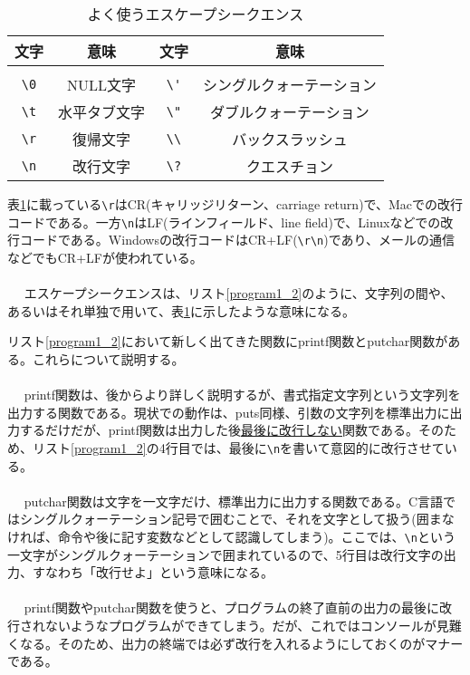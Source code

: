 \begin{table}[htbp]
 \centering
 \caption{よく使うエスケープシークエンス}\label{escape_seq}
  \begin{tabular}{|c|c||c|c|} \hline
            文字&意味&文字&意味        \\ \hline
              &&&          \\[-15.5pt] \hline
   \verb|\0| & NULL文字 &\verb|\'| & シングルクォーテーション\\ \hline
   \verb|\t| & 水平タブ文字 &\verb|\"| & ダブルクォーテーション\\ \hline
   \verb|\r| & 復帰文字 &\verb|\\| & バックスラッシュ\\ \hline
   \verb|\n| & 改行文字 &\verb|\?| & クエスチョン\\ \hline
  \end{tabular}
\end{table}

表\ref{escape_seq}に載っている\verb|\r|はCR(キャリッジリターン、carriage return)で、Macでの改行コードである。一方\verb|\n|はLF(ラインフィールド、line field)で、Linuxなどでの改行コードである。Windowsの改行コードはCR+LF(\verb|\r\n|)であり、メールの通信などでもCR+LFが使われている。
\\ \\　
エスケープシークエンスは、リスト\ref{program1_2}のように、文字列の間や、あるいはそれ単独で用いて、表\ref{escape_seq}に示したような意味になる。

リスト\ref{program1_2}において新しく出てきた関数にprintf関数とputchar関数がある。これらについて説明する。
\\ \\　
printf関数は、後からより詳しく説明するが、書式指定文字列という文字列を出力する関数である。現状での動作は、puts同様、引数の文字列を標準出力に出力するだけだが、printf関数は出力した後\underline{最後に改行しない}関数である。そのため、リスト\ref{program1_2}の4行目では、最後に\verb|\n|を書いて意図的に改行させている。
\\ \\　
putchar関数は文字を一文字だけ、標準出力に出力する関数である。C言語ではシングルクォーテーション記号で囲むことで、それを文字として扱う(囲まなければ、命令や後に記す変数などとして認識してしまう)。ここでは、\verb|\n|という一文字がシングルクォーテーションで囲まれているので、5行目は改行文字の出力、すなわち「改行せよ」という意味になる。
\\ \\　
printf関数やputchar関数を使うと、プログラムの終了直前の出力の最後に改行されないようなプログラムができてしまう。だが、これではコンソールが見難くなる。そのため、出力の終端では必ず改行を入れるようにしておくのがマナーである。
\newpage

